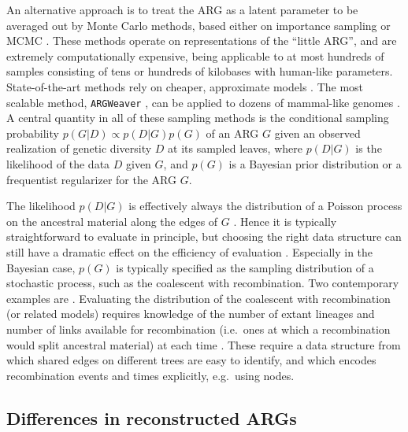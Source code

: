 \documentclass{article}
\begin{document}
An alternative approach is to treat the ARG as a latent parameter to be averaged out
by Monte Carlo methods, based either on importance sampling
\citep{griffiths1996ancestral, fearnhead2001estimating, jenkins2011inference}
or MCMC \citep{kuhner2000maximum, nielsen2000estimation, wang2008bayesian, fallon2013acg, mahmoudi2022bayesian}.
These methods operate on representations of the ``little ARG'', and are extremely computationally
expensive, being applicable to at most hundreds of samples consisting of tens or hundreds of kilobases with
human-like parameters. State-of-the-art methods rely on cheaper, approximate models
\citep{didelot2010inference, heine2018bridging, hubisz2020mapping,hubisz2020inference, medina2020speeding}.
The most scalable method, \texttt{ARGWeaver} \citep{rasmussen2014genome}, can be applied to dozens of mammal-like
genomes \citep{hubisz2020inference}.
A central quantity in all of these sampling methods is the conditional sampling probability
$p(G | D) \propto p(D | G) p(G)$ of an ARG $G$ given an observed realization
of genetic diversity $D$ at its sampled leaves, where $p(D | G)$ is the likelihood
of the data $D$ given $G$, and $p(G)$ is a Bayesian prior distribution or a
frequentist regularizer for the ARG $G$.

The likelihood $p(D | G)$ is effectively always the distribution of
a Poisson process on the ancestral material along the edges of $G$ \citep[Eq.\ (2)]{mahmoudi2022bayesian}.
Hence it is typically straightforward to evaluate in principle, but choosing the
right data structure can still have a dramatic effect on the efficiency of evaluation
\citep{mahmoudi2022bayesian}. Especially in the Bayesian case, $p(G)$ is typically specified
as the sampling distribution of a stochastic process, such as the coalescent with
recombination. Two contemporary examples are
\cite{mahmoudi2022bayesian, guo2022recombination}.
Evaluating the distribution of the coalescent with recombination
(or related models) requires knowledge of the number of extant lineages and
number of links available for recombination (i.e.\ ones at which a recombination
would split ancestral material) at each time \citep[Eq.\ (3)]{mahmoudi2022bayesian}.
These require a data structure from which shared edges on different trees are easy to identify,
and which encodes recombination events and times explicitly, e.g.\ using nodes.

\subsection*{Differences in reconstructed ARGs}
\end{document}
